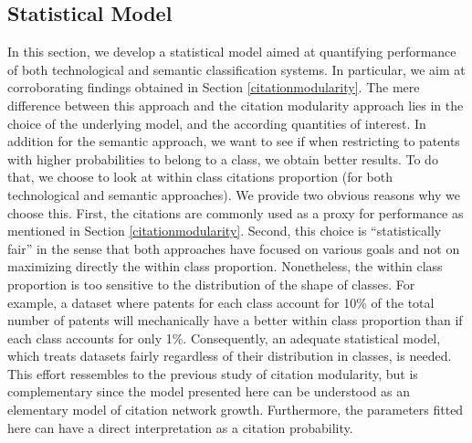 \documentclass[12pt,twoside,a4paper]{article}
\begin{document}
\subsection{Statistical Model}
\label{statisticalmodel}
In this section, we develop a statistical model aimed at quantifying performance of both technological and semantic classification systems. In particular, we aim at corroborating findings obtained in Section \ref{citationmodularity}. The mere difference between this approach and the citation modularity approach lies in the choice of the underlying model, and the according quantities of interest. In addition for the semantic approach, we want to see if when restricting to patents with higher probabilities to belong to a class, we obtain better results. To do that, we choose to look at within class citations proportion (for both technological and semantic approaches). We provide two obvious reasons why we choose this. First, the citations are commonly used as a proxy for performance as mentioned in Section \ref{citationmodularity}. Second, this choice is ``statistically fair'' in the sense that both approaches have focused on various goals and not on maximizing directly the within class proportion. 
Nonetheless, the within class proportion is too sensitive to the distribution of the shape of classes. For example, a dataset where patents for each class account for 10\% of the total number of patents will mechanically have a better within class proportion than if each class accounts for only 1\%. Consequently, an adequate statistical model, which treats datasets fairly regardless of their distribution in classes, is needed. This effort ressembles to the previous study of citation modularity, but is complementary since the model presented here can be understood as an elementary model of citation network growth. Furthermore, the parameters fitted here can have a direct interpretation as a citation probability.
\end{document}
